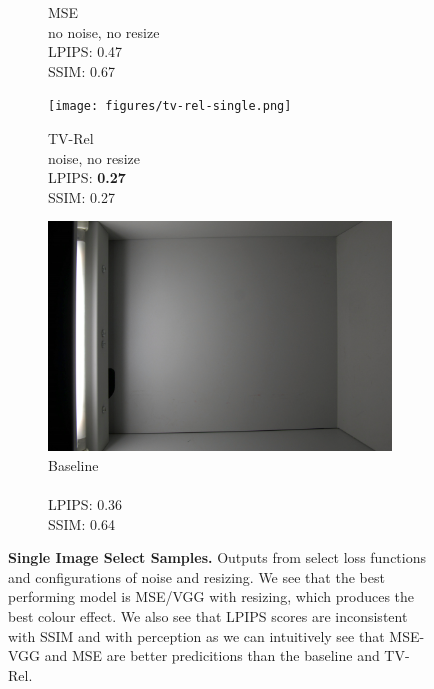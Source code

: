 \begin{figure}
\begin{subfigure}[t]{.19\textwidth}
        \caption{MSE \\ no noise, no resize \\ LPIPS: 0.47 \\ SSIM: 0.67}
      \end{subfigure}
    \hfill
    \begin{subfigure}[t]{.19\textwidth}
      \centering
      \texttt{[image: figures/tv-rel-single.png]}
        \caption{TV-Rel \\ noise, no resize \\ LPIPS: \textbf{0.27} \\ SSIM: 0.27}
    \end{subfigure}
    \hfill
    \begin{subfigure}[t]{.19\textwidth}
        \centering
        \includegraphics[width=\linewidth]{figures/digital-single.png}
        \caption{Baseline \\ \\ LPIPS: 0.36 \\ SSIM: 0.64}
      \end{subfigure}
  
    \caption{\textbf{Single Image Select Samples.} Outputs from select loss functions and configurations of noise and resizing. We see that the best performing model is MSE/VGG with resizing, which produces the best colour effect. We also see that LPIPS scores are inconsistent with SSIM and with perception as we can intuitively see that MSE-VGG and MSE are better predicitions than the baseline and TV-Rel.}

    \label{fig:single-image-samples}
\end{figure}

